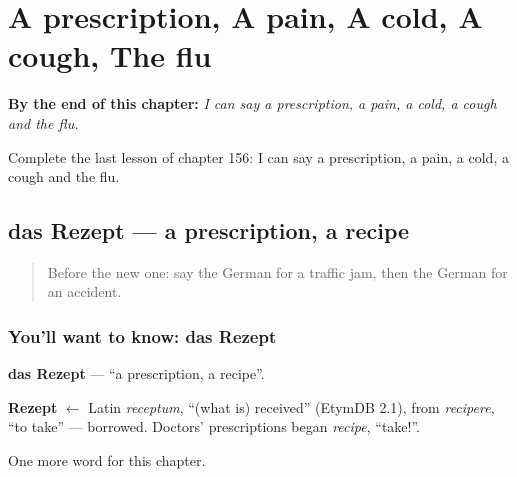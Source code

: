 
\chapter{A prescription, A pain, A cold, A cough, The flu}
\label{ch:ge-a-prescription-a-pain-a-cold-a-cough-the-flu}

\begin{chapteropening}
\textbf{By the end of this chapter:} \emph{I can say a prescription, a pain, a cold, a cough and the flu.}

Complete the last lesson of chapter 156: I can say a prescription, a pain, a cold, a cough and the flu.
\end{chapteropening}

\section[das Rezept]{das Rezept — a prescription, a recipe}

\label{lesson:GE-C156-rezept}



\begin{quote}
Before the new one: say the German for a traffic jam, then the German for an accident.
\end{quote}

\subsection*{You'll want to know: das Rezept}
\textbf{das Rezept} — \textquotedblleft{}a prescription, a recipe\textquotedblright{}.

\begin{cousinweb}
\textbf{Rezept} $\leftarrow$ Latin \emph{receptum}, \textquotedblleft{}(what is) received\textquotedblright{} (EtymDB 2.1), from \emph{recipere}, \textquotedblleft{}to take\textquotedblright{} — borrowed. Doctors' prescriptions began \emph{recipe}, \textquotedblleft{}take!\textquotedblright{}.
\end{cousinweb}

\begin{grammarlens}[title={What you've built}]
One more word for this chapter.
\end{grammarlens}

